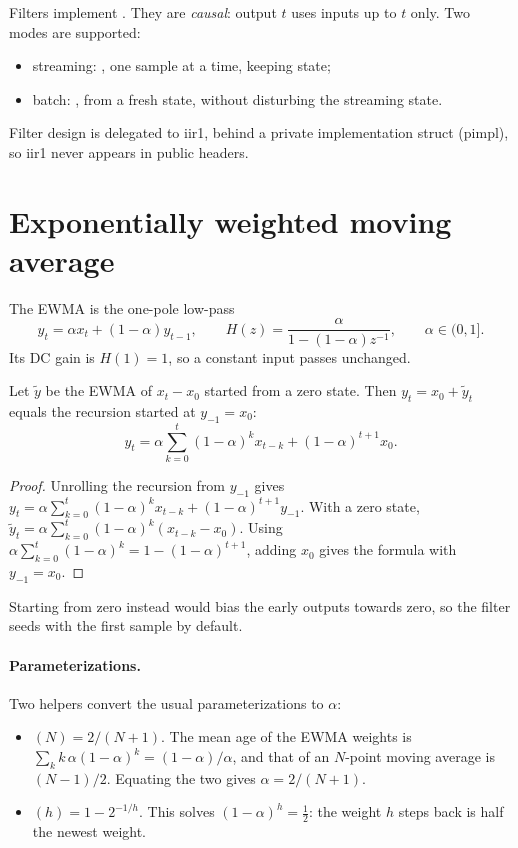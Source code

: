 Filters implement . They are \emph{causal}: output $t$ uses inputs up to
$t$ only. Two modes are supported:
\begin{itemize}
  \item streaming: , one sample at a time, keeping state;
  \item batch: , from a fresh state, without disturbing the streaming
        state.
\end{itemize}
Filter design is delegated to iir1, behind a private implementation struct (pimpl), so iir1
never appears in public headers.

\section{Exponentially weighted moving average}
The EWMA is the one-pole low-pass
\[
  y_t=\alpha x_t+(1-\alpha)y_{t-1},\qquad H(z)=\frac{\alpha}{1-(1-\alpha)z^{-1}},\qquad \alpha\in(0,1].
\]
Its DC gain is $H(1)=1$, so a constant input passes unchanged.

\begin{proposition}[Seeding]
Let $\tilde y$ be the EWMA of $x_t-x_0$ started from a zero state. Then $y_t=x_0+\tilde y_t$
equals the recursion started at $y_{-1}=x_0$:
\[
  y_t=\alpha\sum_{k=0}^{t}(1-\alpha)^k x_{t-k}+(1-\alpha)^{t+1}x_0 .
\]
\end{proposition}
\begin{proof}
Unrolling the recursion from $y_{-1}$ gives
$y_t=\alpha\sum_{k=0}^{t}(1-\alpha)^kx_{t-k}+(1-\alpha)^{t+1}y_{-1}$. With a zero state,
$\tilde y_t=\alpha\sum_{k=0}^t(1-\alpha)^k(x_{t-k}-x_0)$. Using
$\alpha\sum_{k=0}^t(1-\alpha)^k=1-(1-\alpha)^{t+1}$, adding $x_0$ gives the formula with
$y_{-1}=x_0$.
\end{proof}
Starting from zero instead would bias the early outputs towards zero, so the filter seeds
with the first sample by default.

\paragraph{Parameterizations.} Two helpers convert the usual parameterizations to $\alpha$:
\begin{itemize}
  \item {}$(N)=2/(N+1)$. The mean age of the EWMA weights is
        $\sum_k k\,\alpha(1-\alpha)^k=(1-\alpha)/\alpha$, and that of an $N$-point moving
        average is $(N-1)/2$. Equating the two gives $\alpha=2/(N+1)$.
  \item {}$(h)=1-2^{-1/h}$. This solves $(1-\alpha)^h=\tfrac12$:
        the weight $h$ steps back is half the newest weight.
\end{itemize}

